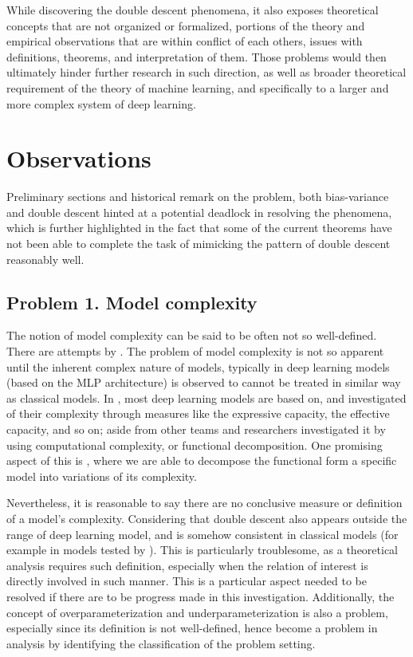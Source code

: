 \documentclass[10pt]{article}
\begin{document}
While discovering the double descent phenomena, it also exposes theoretical concepts that are not organized or formalized, portions of the theory and empirical observations that are within conflict of each others, issues with definitions, theorems, and interpretation of them. Those problems would then ultimately hinder further research in such direction, as well as broader theoretical requirement of the theory of machine learning, and specifically to a larger and more complex system of deep learning. 

\clearpage

\section{Observations}
Preliminary sections and historical remark on the problem, both bias-variance and double descent hinted at a potential deadlock in resolving the phenomena, which is further highlighted in the fact that some of the current theorems have not been able to complete the task of mimicking the pattern of double descent reasonably well. 

\subsection*{Problem 1. Model complexity}
The notion of model complexity can be said to be often not so well-defined. There are attempts by \cite{hu2021modelcomplexitydeeplearning,luo2024investigatingimpactmodelcomplexity,barceló2020modelinterpretabilitylenscomputational,Molnar_2020,janik2021complexitydeepneuralnetworks}. The problem of model complexity is not so apparent until the inherent complex nature of models, typically in deep learning models (based on the MLP architecture) is observed to cannot be treated in similar way as classical models. In \cite{hu2021modelcomplexitydeeplearning}, most deep learning models are based on, and investigated of their complexity through measures like the expressive capacity, the effective capacity, and so on; aside from other teams and researchers investigated it by using computational complexity, or functional decomposition. One promising aspect of this is \cite{Molnar_2020}, where we are able to decompose the functional form a specific model into variations of its complexity. 

Nevertheless, it is reasonable to say there are no conclusive measure or definition of a model's complexity. Considering that double descent also appears outside the range of deep learning model, and is somehow consistent in classical models (for example in models tested by \cite{belkin_reconciling_2019}). This is particularly troublesome, as a theoretical analysis requires such definition, especially when the relation of interest is directly involved in such manner. This is a particular aspect needed to be resolved if there are to be progress made in this investigation. Additionally, the concept of overparameterization and underparameterization is also a problem, especially since its definition is not well-defined, hence become a problem in analysis by identifying the classification of the problem setting. 
\end{document}
